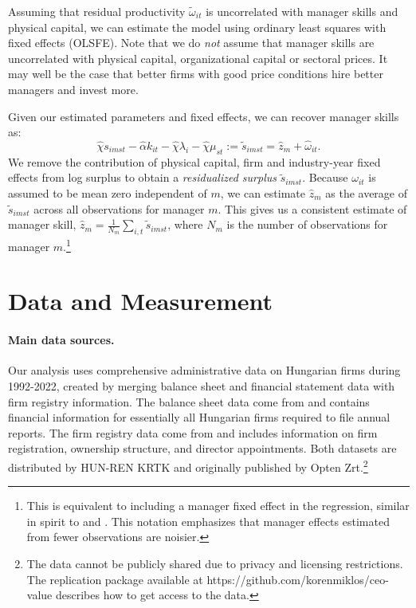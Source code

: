 \documentclass[11pt,a4paper]{article}
\begin{document}
Assuming that residual productivity $\tilde\omega_{it}$ is uncorrelated with manager skills and physical capital, we can estimate the model using ordinary least squares with fixed effects (OLSFE). Note that we do \emph{not} assume that manager skills are uncorrelated with physical capital, organizational capital or sectoral prices. It may well be the case that better firms with good price conditions hire better managers and invest more. 

Given our estimated parameters and fixed effects, we can recover manager skills as:
\begin{equation}\label{eq:estimated}
\hat\chi s_{imst} -  \hat\alpha k_{it}  -\hat\chi \lambda_i -\hat\chi \mu_{st} := \tilde s_{imst} = \hat z_m + \hat\omega_{it}. 
\end{equation}
We remove the contribution of physical capital, firm and industry-year fixed effects from log surplus to obtain a \emph{residualized surplus} $\tilde s_{imst}$. Because $\omega_{it}$ is assumed to be mean zero independent of $m$, we can estimate $\hat z_m$ as the average of $\tilde s_{imst}$ across all observations for manager $m$. This gives us a consistent estimate of manager skill, $\hat z_m = \frac1{N_m}\sum_{i,t} \tilde s_{imst}$, where $N_m$ is the number of observations for manager $m$.\footnote{This is equivalent to including a manager fixed effect in the regression, similar in spirit to \citet{Abowd1999Econometrica} and \citet{Card2018JoLE}. This notation emphasizes that manager effects estimated from fewer observations are noisier.}

\section{Data and Measurement}
\paragraph{Main data sources.} Our analysis uses comprehensive administrative data on Hungarian firms during 1992-2022, created by merging balance sheet and financial statement data with firm registry information. The balance sheet data come from \citet{merleg2024} and contains financial information for essentially all Hungarian firms required to file annual reports. The firm registry data come from \citet{cegjegyzek2024} and includes information on firm registration, ownership structure, and director appointments. Both datasets are distributed by HUN-REN KRTK and originally published by Opten Zrt.\footnote{The data cannot be publicly shared due to privacy and licensing restrictions. The replication package available at https://github.com/korenmiklos/ceo-value describes how to get access to the data.}
\end{document}

